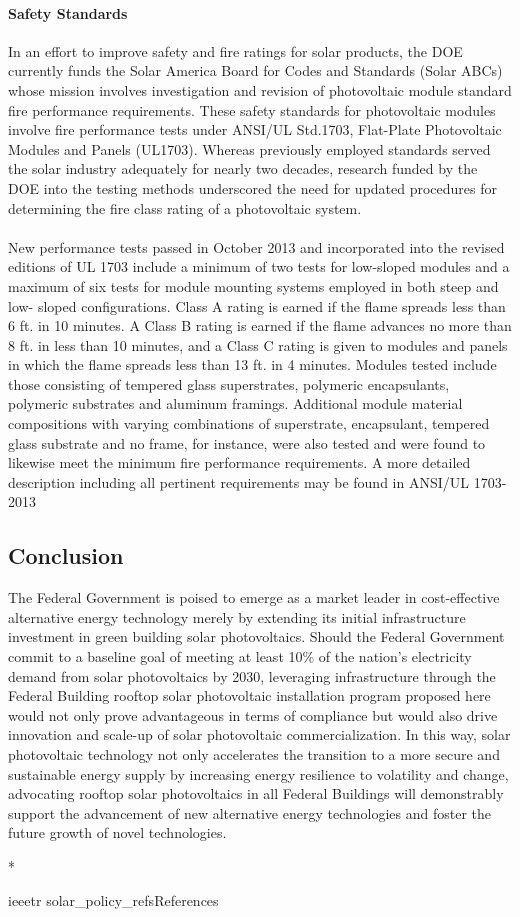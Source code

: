 \paragraph{Safety Standards}
In an effort to improve safety and fire ratings for solar products, the DOE currently funds the Solar America Board for Codes and Standards (Solar ABCs) whose mission involves investigation and revision of photovoltaic module standard fire performance requirements. These safety standards for photovoltaic modules involve fire performance tests under ANSI/UL Std.1703, Flat-Plate Photovoltaic Modules and Panels (UL1703). Whereas previously employed standards served the solar industry adequately for nearly two decades, research funded by the DOE into the testing methods underscored the need for updated procedures for determining the fire class rating of a photovoltaic system.
\\\\
\noindent New performance tests passed in October 2013 and incorporated into the revised editions of UL 1703 include a minimum of two tests for low-sloped modules and a maximum of six tests for module mounting systems employed in both steep and low- sloped configurations. Class A rating is earned if the flame spreads less than 6 ft. in 10 minutes. A Class B rating is earned if the flame advances no more than 8 ft. in less than 10 minutes, and a Class C rating is given to modules and panels in which the flame spreads less than 13 ft. in 4 minutes. Modules tested include those consisting of tempered glass superstrates, polymeric encapsulants, polymeric substrates and aluminum framings. Additional module material compositions with varying combinations of superstrate, encapsulant, tempered glass substrate and no frame, for instance, were also tested and were found to likewise meet the minimum fire performance requirements. A more detailed description including all pertinent requirements may be found in ANSI/UL 1703-2013

\subsection{Conclusion}
The Federal Government is poised to emerge as a market leader in cost-effective alternative energy technology merely by extending its initial infrastructure investment in green building solar photovoltaics. Should the Federal Government commit to a baseline goal of meeting at least 10\% of the nation’s electricity demand from solar photovoltaics by 2030, leveraging infrastructure through the Federal Building rooftop solar photovoltaic installation program proposed here would not only prove advantageous in terms of compliance but would also drive innovation and scale-up of solar photovoltaic commercialization. In this way, solar photovoltaic technology not only accelerates the transition to a more secure and sustainable energy supply by increasing energy resilience to volatility and change, advocating rooftop solar photovoltaics in all Federal Buildings will demonstrably support the advancement of new alternative energy technologies and foster the future growth of novel technologies.

\nocite{julie}{*}

\clearpage
{ieeetr}
{solar_policy_refs}{References}
